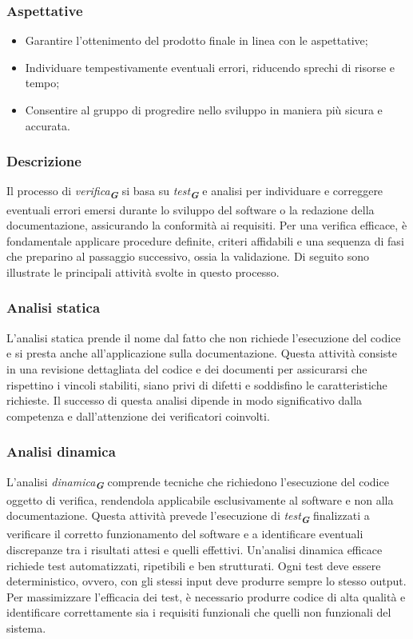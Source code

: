 \subsubsection{Aspettative}
\begin{itemize}
    \item Garantire l'ottenimento del prodotto finale in linea con le aspettative;
    \item Individuare tempestivamente eventuali errori, riducendo sprechi di risorse e tempo;
    \item Consentire al gruppo di progredire nello sviluppo in maniera più sicura e accurata.
\end{itemize}

\subsubsection{Descrizione}
Il processo di \emph{verifica}\textsubscript{\textit{\textbf{G}}} si basa su \emph{test}\textsubscript{\textit{\textbf{G}}} e analisi per individuare e correggere eventuali errori emersi durante lo sviluppo del software o la redazione della documentazione, assicurando la conformità ai requisiti. Per una verifica efficace, è fondamentale applicare procedure definite, criteri affidabili e una sequenza di fasi che preparino al passaggio successivo, ossia la validazione. Di seguito sono illustrate le principali attività svolte in questo processo.

\subsubsection{Analisi statica}
L’analisi statica prende il nome dal fatto che non richiede l’esecuzione del codice e si presta anche all’applicazione sulla documentazione. Questa attività consiste in una revisione dettagliata del codice e dei documenti per assicurarsi che rispettino i vincoli stabiliti, siano privi di difetti e soddisfino le caratteristiche richieste. Il successo di questa analisi dipende in modo significativo dalla competenza e dall’attenzione dei verificatori coinvolti.

\subsubsection{Analisi dinamica}
L’analisi \emph{dinamica}\textsubscript{\textit{\textbf{G}}} comprende tecniche che richiedono l’esecuzione del codice oggetto di verifica, rendendola applicabile esclusivamente al software e non alla documentazione. Questa attività prevede l’esecuzione di \emph{test}\textsubscript{\textit{\textbf{G}}} finalizzati a verificare il corretto funzionamento del software e a identificare eventuali discrepanze tra i risultati attesi e quelli effettivi.
Un’analisi dinamica efficace richiede test automatizzati, ripetibili e ben strutturati. Ogni test deve essere deterministico, ovvero, con gli stessi input deve produrre sempre lo stesso output. 
Per massimizzare l’efficacia dei test, è necessario produrre codice di alta qualità e identificare correttamente sia i requisiti funzionali che quelli non funzionali del sistema.
